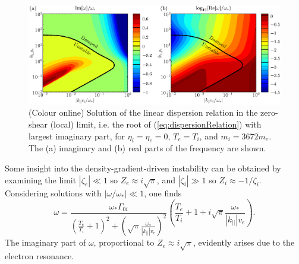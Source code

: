 \documentclass{jpp}
\begin{document}
\begin{figure}
\centerline{\includegraphics[width=6in]{fig10.eps}}
\caption{(Colour online) Solution of the linear dispersion relation in the zero-shear (local) limit, i.e. the
root of (\ref{eq:dispersionRelation}) with largest imaginary part, for $\eta_i = \eta_e = 0$,
$T_e = T_i$, and $m_i = 3672 m_e$.
The (a) imaginary and (b)
real parts of the frequency are shown.
\label{fig:localDispersionRelation}}
\end{figure}

Some insight into the density-gradient-driven instability can be obtained by
examining the limit $|\zeta_e| \ll 1$ so $Z_e \approx i\sqrt{\pi}$,
and $|\zeta_i| \gg 1$ so $Z_i \approx -1/\zeta_i$. Considering solutions with $|\omega/\omega_*| \ll 1$,
one finds
\begin{equation}
\label{eq:approxRoot}
\omega = \frac{\omega_* \Gamma_{0i}}
{\left(\frac{T_e}{T_i}+1\right)^2 + \left(\sqrt{\pi}\frac{\omega_*}{|k_{||}| v_e}\right)^2}
\left( \frac{T_e}{T_i} + 1 + i \sqrt{\pi}\frac{\omega_*}{|k_{||}| v_e}\right).
\end{equation}
The imaginary part of $\omega$, proportional to  $Z_e \approx i\sqrt{\pi}$, evidently arises due to the electron resonance.




\end{document}
